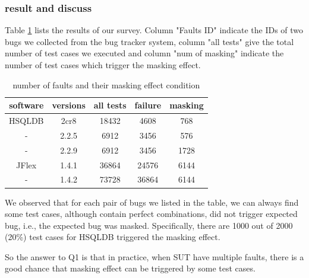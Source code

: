 \documentclass{sig-alternate}
\begin{document}
\subsubsection{result and discuss}

Table \ref{masking effect condition} lists the results of our survey. Column "Faults ID" indicate the IDs of two bugs we collected from the bug tracker system, column "all tests" give the total number of test cases we executed and column "num of masking" indicate the number of test cases which trigger the masking effect.

\begin{table}\renewcommand{\arraystretch}{1.3}
\caption{number of faults and their masking effect condition}
\label{masking effect condition}
\begin{tabular}{c|c|c|c|c} \hline
software & versions & all tests & failure & masking\\ \hline
HSQLDB & 2cr8 & 18432 & 4608 & 768\\ \hline
     - & 2.2.5 & 6912 & 3456 & 576\\ \hline
     - & 2.2.9 & 6912 & 3456 &1728\\ \hline
JFlex & 1.4.1 & 36864 & 24576 &6144\\ \hline
     -& 1.4.2 & 73728 & 36864 &6144\\ \hline
\hline\end{tabular}
\end{table}

We observed that for each pair of bugs we listed in the table, we can always find some test cases, although contain perfect combinations, did not trigger expected bug, i.e., the expected bug was masked. Specifically, there are 1000 out of 2000 (20\%) test cases for HSQLDB triggered the masking effect.

So the answer to Q1 is that in practice, when SUT have multiple faults, there is a good chance that masking effect can be triggered by some test cases.

%
%
\end{document}
